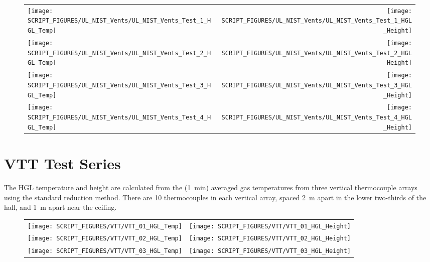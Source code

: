 \newpage

\begin{figure}[p]
\begin{tabular*}{\textwidth}{l@{\extracolsep{\fill}}r}
\texttt{[image: SCRIPT\_FIGURES/UL\_NIST\_Vents/UL\_NIST\_Vents\_Test\_1\_HGL\_Temp]} &
\texttt{[image: SCRIPT\_FIGURES/UL\_NIST\_Vents/UL\_NIST\_Vents\_Test\_1\_HGL\_Height]} \\
\texttt{[image: SCRIPT\_FIGURES/UL\_NIST\_Vents/UL\_NIST\_Vents\_Test\_2\_HGL\_Temp]} &
\texttt{[image: SCRIPT\_FIGURES/UL\_NIST\_Vents/UL\_NIST\_Vents\_Test\_2\_HGL\_Height]} \\
\texttt{[image: SCRIPT\_FIGURES/UL\_NIST\_Vents/UL\_NIST\_Vents\_Test\_3\_HGL\_Temp]} &
\texttt{[image: SCRIPT\_FIGURES/UL\_NIST\_Vents/UL\_NIST\_Vents\_Test\_3\_HGL\_Height]} \\
\texttt{[image: SCRIPT\_FIGURES/UL\_NIST\_Vents/UL\_NIST\_Vents\_Test\_4\_HGL\_Temp]} &
\texttt{[image: SCRIPT\_FIGURES/UL\_NIST\_Vents/UL\_NIST\_Vents\_Test\_4\_HGL\_Height]} 
\end{tabular*}
\end{figure}

\clearpage

\section{VTT Test Series}

The HGL temperature and height are calculated from the (1~min) averaged gas temperatures from three vertical thermocouple arrays using the standard reduction method. There are 10 thermocouples in each vertical array, spaced 2~m apart in the lower two-thirds of the hall, and 1~m apart near the ceiling.

\begin{figure}[h!]
\begin{tabular*}{\textwidth}{l@{\extracolsep{\fill}}r}
\texttt{[image: SCRIPT\_FIGURES/VTT/VTT\_01\_HGL\_Temp]} &
\texttt{[image: SCRIPT\_FIGURES/VTT/VTT\_01\_HGL\_Height]} \\
\texttt{[image: SCRIPT\_FIGURES/VTT/VTT\_02\_HGL\_Temp]} &
\texttt{[image: SCRIPT\_FIGURES/VTT/VTT\_02\_HGL\_Height]} \\
\texttt{[image: SCRIPT\_FIGURES/VTT/VTT\_03\_HGL\_Temp]} &
\texttt{[image: SCRIPT\_FIGURES/VTT/VTT\_03\_HGL\_Height]}
\end{tabular*}
\end{figure}



